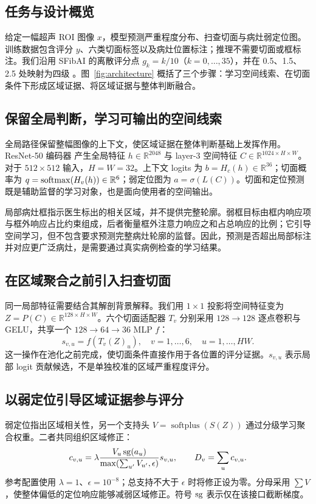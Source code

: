 \subsection{任务与设计概览}
给定一幅超声 ROI 图像 $x$，模型预测严重程度分布、扫查切面与病灶弱定位图。训练数据包含评分 $y$、六类切面标签以及病灶位置标注；推理不需要切面或框标注。我们沿用 SFibAI 的离散评分点 $g_k=k/10$（$k=0,\ldots,35$），并在 0.5、1.5、2.5 处映射为四级 \citep{xu2026sfibai}。图~\ref{fig:architecture} 概括了三个步骤：学习空间线索、在切面条件下形成区域证据、将区域证据与整体判断融合。

\subsection{保留全局判断，学习可输出的空间线索}
全局路径保留整幅图像的上下文，使区域证据在整体判断基础上发挥作用。ResNet-50 编码器 \citep{he2016resnet} 产生全局特征 $h\in\mathbb{R}^{2048}$ 与 layer-3 空间特征 $C\in\mathbb{R}^{1024\times H\times W}$。对于 $512\times512$ 输入，$H=W=32$。上下文 logits 为 $b=H_c(h)\in\mathbb{R}^{36}$；切面概率为 $q=\operatorname{softmax}(H_v(h))\in\mathbb{R}^{6}$；弱定位图为 $a=\sigma(L(C))$。切面和定位预测既是辅助监督的学习对象，也是面向使用者的空间输出。

局部病灶框指示医生标出的相关区域，并不提供完整轮廓。弱框目标由框内响应项与框外响应占比约束组成，后者衡量框外注意力响应之和占总响应的比例；它引导空间学习，但不包含要求预测完整病灶轮廓的监督。因此，预测是否超出局部标注并对应更广泛病灶，是需要通过真实病例检查的学习结果。

\subsection{在区域聚合之前引入扫查切面}
同一局部特征需要结合其解剖背景解释。我们用 $1\times1$ 投影将空间特征变为 $Z=P(C)\in\mathbb{R}^{128\times H\times W}$。六个切面适配器 $T_v$ 分别采用 $128\rightarrow128$ 逐点卷积与 GELU，共享一个 $128\rightarrow64\rightarrow36$ MLP $f$：
\begin{equation}
s_{v,u}=f(T_v(Z)_u),\quad v=1,\ldots,6,\quad u=1,\ldots,HW .
\label{eq:local}
\end{equation}
这一操作在池化之前完成，使切面条件直接作用于各位置的评分证据。$s_{v,u}$ 表示局部 logit 贡献候选，不是单独校准的区域严重程度评分。

\subsection{以弱定位引导区域证据参与评分}
弱定位指出区域相关性，另一个支持头 $V=\operatorname{softplus}(S(Z))$ 通过分级学习聚合权重。二者共同组织区域修正：
\begin{equation}
c_{v,u}=\lambda\frac{V_u\operatorname{sg}(a_u)}{\max(\sum_{u'}V_{u'},\epsilon)}s_{v,u},
\qquad D_v=\sum_u c_{v,u}.
\label{eq:regional}
\end{equation}
参考配置使用 $\lambda=1$、$\epsilon=10^{-8}$；总支持不大于 $\epsilon$ 时将修正设为零。分母采用 $\sum V$，使整体偏低的定位响应能够减弱区域修正。符号 $\operatorname{sg}$ 表示仅在该接口截断梯度。

